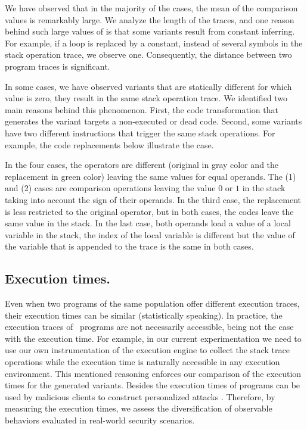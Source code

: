We have observed that in the majority of the cases, the mean of the comparison values is remarkably large. We analyze the length of the traces, and one reason behind such large values of \DTW is that some variants result from constant inferring. For example, if a loop is replaced by a constant, instead of several symbols in the stack operation trace, we observe one. Consequently, the distance between two program traces is significant. 

In some cases, we have observed variants that are statically different for which \DTW value is zero, \ie they result in the same stack operation trace. We identified two main reasons behind this phenomenon. First, the code transformation that generates the variant targets a non-executed or dead code. Second, some variants have two different instructions that trigger the same stack operations. For example, the code replacements below illustrate the case. 



In the four cases, the operators are different (original in gray color and the replacement in green color) leaving the same values for equal operands.
The (1) and (2) cases are comparison operations leaving the value $0$ or $1$ in the stack taking into account the sign of their operands.  In the third case, the replacement is less restricted to the original operator, but in both cases, the codes leave the same value in the stack. In the last case, both operands load a value of a local variable in the stack, the index of the local variable is different but the value of the variable that is appended to the trace is the same in both cases. 

\subsection{Execution times.}


Even when two programs of the same population offer different execution traces, their execution times can be similar (statistically speaking). In practice, the execution traces of \wasm\ programs are not necessarily accessible, being not the case with the execution time. For example, in our current experimentation we need to use our own instrumentation of the execution engine to collect the stack trace operations while the execution time is naturally accessible in any execution environment. This mentioned reasoning enforces our comparison of the execution times for the generated variants. Besides the execution times of programs can be used by malicious clients to construct personalized attacks \cite{morgan2015web}. Therefore, by measuring the execution times, we assess the diversification of observable behaviors evaluated in real-world security scenarios.


